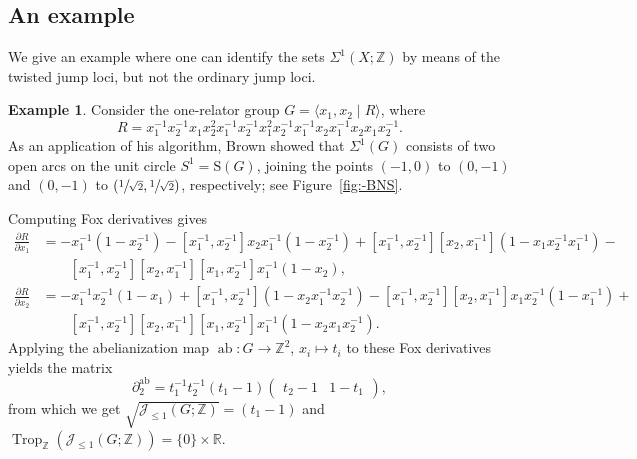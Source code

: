 \documentclass[11pt]{amsart}
\theoremstyle{definition}
\newtheorem{example}[theorem]{Example}
\newcommand{\Z}{\mathbb{Z}}
\newcommand{\R}{\mathbb{R}}
\newcommand{\cJ}{\mathcal{J}}
\newcommand{\rS}{\mathrm{S}}
\DeclareMathOperator{\ab}{{ab}}
\DeclareMathOperator{\Trop}{Trop}
\begin{document}
\subsection{An example}
\label{subsec:ex-bns-twistjump}
We give an example where one  can identify the sets $\Sigma^1(X;\Z)$ by 
means of the twisted jump loci, but not the ordinary jump loci.

\begin{example}
\label{ex:one-rel}
Consider the one-relator group $G=\langle x_1,x_2 \mid R\rangle$, where 
\[
R= x_1^{-1} x_2^{-1} x_1 x_2^2 x_1^{-1} x_2^{-1}
x_1^2 x_2^{-1} x_1^{-1} x_2 x_ 1^{-1} x_2 x_1 x_2^{-1} .
\]
As an application of his algorithm, Brown \cite{Br} showed that 
$\Sigma^1(G)$ consists of two open arcs on the unit circle $S^1=\rS(G)$, 
joining the points $(-1,0)$ to $(0,-1)$ and $ (0,-1)$ to 
$(\sfrac{1}{\sqrt{2}},\sfrac{1}{\sqrt{2}})$, 
respectively; see Figure~\ref{fig:-BNS}. 

Computing Fox derivatives gives 
\begin{align*}
\frac{\partial{R}}{\partial x_1}
&=-x_1^{-1}(1 -x_2^{-1})- [x_1^{-1},x_2^{-1}] x_2 x_1^{-1}(1-x_2^{-1}) + 
[x_1^{-1},x_2^{-1}][x_2,x_1^{-1}](1-x_1x_2^{-1}x_1^{-1})-\\
&\qquad 
[x_1^{-1},x_2^{-1}][x_2,x_1^{-1}][x_1,x_2^{-1}]x_1^{-1}(1-x_2),
\\
\frac{\partial{R}}{\partial x_2}
&=-x_1^{-1}x_2^{-1} (1-x_1) + [x_1^{-1},x_2^{-1}](1-x_2 x_1^{-1}x_2^{-1}) - 
[x_1^{-1},x_2^{-1}][x_2,x_1^{-1}]x_1 x_2^{-1}(1-x_1^{-1}) + \\
&\qquad 
[x_1^{-1},x_2^{-1}][x_2,x_1^{-1}][x_1,x_2^{-1}]x_1^{-1}(1-x_2 x_1 x_2^{-1}).
\end{align*}
%
Applying the abelianization map $\ab\colon G\to \Z^2$, $x_i\mapsto t_i$ to 
these Fox derivatives yields the matrix
\[
\partial_2^{\ab}= 
 t_1^{-1}t_2^{-1}(t_1-1)\begin{pmatrix}
 t_2-1  & 1-t_1
\end{pmatrix},
\]
from which we get   
$\sqrt{\cJ_{\leqslant 1}(G; \Z)}=(t_1-1)$ and 
$\Trop_\Z( \cJ_{\leqslant 1}(G; \Z))=\{0\}\times \R$.


\end{example}
\end{document}
